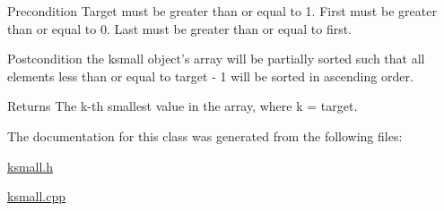 \begin{DoxyPrecond}{Precondition}
Target must be greater than or equal to 1. First must be greater than or equal to 0. Last must be greater than or equal to first. 
\end{DoxyPrecond}
\begin{DoxyPostcond}{Postcondition}
the ksmall object's array will be partially sorted such that all elements less than or equal to target -\/ 1 will be sorted in ascending order. 
\end{DoxyPostcond}
\begin{DoxyReturn}{Returns}
The k-\/th smallest value in the array, where k = target. 
\end{DoxyReturn}


The documentation for this class was generated from the following files\-:\begin{DoxyCompactItemize}
\item 
\hyperlink{ksmall_8h}{ksmall.\-h}\item 
\hyperlink{ksmall_8cpp}{ksmall.\-cpp}\end{DoxyCompactItemize}
